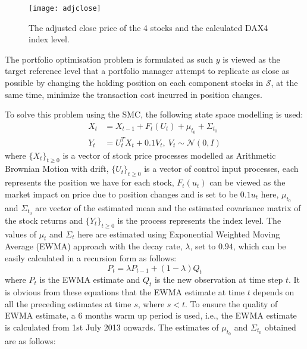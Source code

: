 \begin{figure}[htbp]
\centering
\texttt{[image: adjclose]}
\caption{The adjusted close price of the 4 stocks and the calculated DAX4 index level.}
\label{fig:adjclose}
\end{figure}
 
The portfolio optimisation problem is formulated as such $y$ is viewed as the target reference level that a portfolio manager attempt to replicate as close as possible by changing the holding position on each component stocks in $\mathcal{S}$, at the same time, minimize the transaction cost incurred in position changes.
 
To solve this problem using the SMC,  the following state space modelling is used:
\begin{align}
  X_t &= X_{t-1} + F_t(U_t) + \mu_{t_0} + \Sigma_{t_0} \\
  Y_t &= U^T_tX_t + 0.1V_t,~V_t \sim \mathcal{N}(0, I)
\end{align}
where $\{X_t\}_{t \geq 0}$ is a vector of stock price processes modelled as Arithmetic Brownian Motion with drift, $\{U_t\}_{t \geq 0}$ is a vector of control input processes, each represents the position we have for each stock, $F_t(u_t)$ can be viewed as the market impact on price due to position changes and is set to be $0.1u_t$ here, $\mu_{t_0}$ and $\Sigma_{t_0}$ are vector of the estimated mean and the estimated covariance matrix of the stock returns and $\{Y_t\}_{t \geq 0}$ is the process represents the index level. The values of $\mu_t$ and $\Sigma_t$ here are estimated using Exponential Weighted Moving Average (EWMA) approach with the decay rate, $\lambda$, set to $0.94$, which can be easily calculated in a recursion form as follows:
\begin{equation}
  P_t = \lambda P_{t-1} + (1-\lambda) Q_{t}
\end{equation}
where $P_t$ is the EWMA estimate and $Q_t$ is the new observation at time step $t$. It is obvious from these equations that the EWMA estimate at time $t$ depends on all the preceding estimates at time $s$, where $s < t$. To ensure the quality of EWMA estimate, a 6 months warm up period is used, i.e., the EWMA estimate is calculated from 1st July 2013 onwards. The estimates of $\mu_{t_0}$ and $\Sigma_{t_0}$ obtained are as follows:
